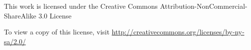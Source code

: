 
\begin{copyrightpage} 



This work is licensed under the Creative Commons
Attribution-NonCommercial-ShareAlike 3.0 License

\noindent To view a copy of this license, visit
\href{http://creativecommons.org/licenses/by‐ny‐sa/2.0/}{
http://creativecommons.org/licenses/by‐ny‐sa/2.0/}

\end{copyrightpage}

